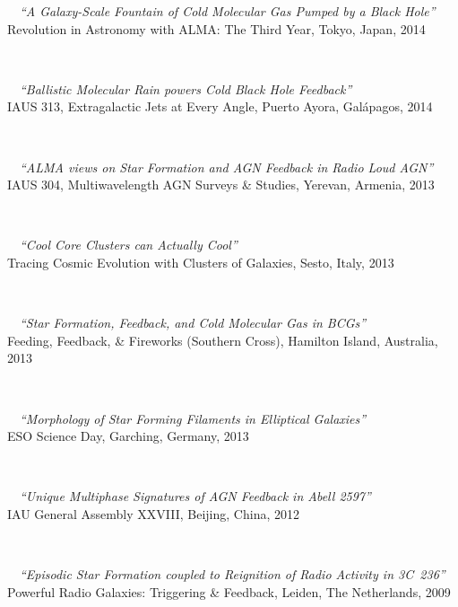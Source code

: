 \documentclass[11pt]{article}
\begin{document}
\hspace{42mm} \parbox{5.15in}{
\textbullet~~\textit{``A Galaxy-Scale Fountain of Cold Molecular Gas Pumped by a Black Hole''} \\
Revolution in Astronomy with ALMA: The Third Year, Tokyo, Japan, 2014}\\


\hspace{42mm} \parbox{5.15in}{
\textbullet~~\textit{``Ballistic Molecular Rain powers Cold Black Hole Feedback''} \\
IAUS 313, Extragalactic Jets at Every Angle, Puerto Ayora, Gal\'{a}pagos, 2014}\\

\hspace{42mm} \parbox{5.15in}{
\textbullet~~\textit{``ALMA views on Star Formation and AGN Feedback in Radio Loud AGN''} \\
IAUS 304, Multiwavelength AGN Surveys \& Studies, Yerevan, Armenia, 2013}\\


\hspace{42mm} \parbox{5.15in}{
\textbullet~~\textit{``Cool Core Clusters can Actually Cool''} \\ Tracing Cosmic Evolution with Clusters of Galaxies, Sesto, Italy, 2013} \\


\hspace{42mm} \parbox{5.15in}{
\textbullet~~\textit{``Star Formation, Feedback, and Cold Molecular Gas in BCGs''} \\ Feeding, Feedback, \& Fireworks (Southern Cross), Hamilton Island, Australia, 2013} \\


\hspace{42mm} \parbox{5.15in}{
\textbullet~~\textit{``Morphology of Star Forming Filaments in Elliptical Galaxies''} \\ ESO Science Day, Garching, Germany, 2013}\\

\hspace{42mm} \parbox{5.15in}{
\textbullet~~\textit{``Unique Multiphase Signatures of AGN Feedback in Abell 2597''} \\ IAU General Assembly XXVIII, Beijing, China, 2012 } \\


\hspace{42mm} \parbox{5.15in}{
\textbullet~~\textit{``Episodic Star Formation coupled to Reignition of Radio Activity in 3C~236''} \\
Powerful Radio Galaxies: Triggering \& Feedback, Leiden, The Netherlands, 2009 } \\
\end{document}
